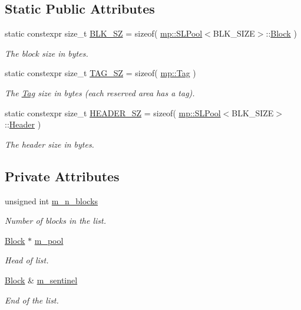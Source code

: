 \subsection*{Static Public Attributes}
\begin{DoxyCompactItemize}
\item 
static constexpr size\+\_\+t \hyperlink{classmp_1_1_s_l_pool_a9713b7eaf26afed603cab879a2144dbf}{B\+L\+K\+\_\+\+SZ} = sizeof( \hyperlink{classmp_1_1_s_l_pool}{mp\+::\+S\+L\+Pool}$<$B\+L\+K\+\_\+\+S\+I\+ZE$>$\+::\hyperlink{structmp_1_1_s_l_pool_1_1_block}{Block} )
\begin{DoxyCompactList}\small\item\em The block size in bytes. \end{DoxyCompactList}\item 
static constexpr size\+\_\+t \hyperlink{classmp_1_1_s_l_pool_aa43372c95c4efa9d0609e6338d5ffacd}{T\+A\+G\+\_\+\+SZ} = sizeof( \hyperlink{namespacemp_structmp_1_1_tag}{mp\+::\+Tag} )
\begin{DoxyCompactList}\small\item\em The \hyperlink{namespacemp_structmp_1_1_tag}{Tag} size in bytes (each reserved area has a tag). \end{DoxyCompactList}\item 
static constexpr size\+\_\+t \hyperlink{classmp_1_1_s_l_pool_a6a08294207c41778969fa9316e1374dc}{H\+E\+A\+D\+E\+R\+\_\+\+SZ} = sizeof( \hyperlink{classmp_1_1_s_l_pool}{mp\+::\+S\+L\+Pool}$<$B\+L\+K\+\_\+\+S\+I\+ZE$>$\+::\hyperlink{structmp_1_1_s_l_pool_1_1_header}{Header} )
\begin{DoxyCompactList}\small\item\em The header size in bytes. \end{DoxyCompactList}\end{DoxyCompactItemize}
\subsection*{Private Attributes}
\begin{DoxyCompactItemize}
\item 
unsigned int \hyperlink{classmp_1_1_s_l_pool_ad0aad2c91ed55f7ce1e2f8c3da37006d}{m\+\_\+n\+\_\+blocks}
\begin{DoxyCompactList}\small\item\em Number of blocks in the list. \end{DoxyCompactList}\item 
\hyperlink{structmp_1_1_s_l_pool_1_1_block}{Block} $\ast$ \hyperlink{classmp_1_1_s_l_pool_a27f201ccadbf0bddca5ccc53473bde39}{m\+\_\+pool}
\begin{DoxyCompactList}\small\item\em Head of list. \end{DoxyCompactList}\item 
\hyperlink{structmp_1_1_s_l_pool_1_1_block}{Block} \& \hyperlink{classmp_1_1_s_l_pool_a3c3858050e1ca40c314ae8cfd3612d38}{m\+\_\+sentinel}
\begin{DoxyCompactList}\small\item\em End of the list. \end{DoxyCompactList}\end{DoxyCompactItemize}


